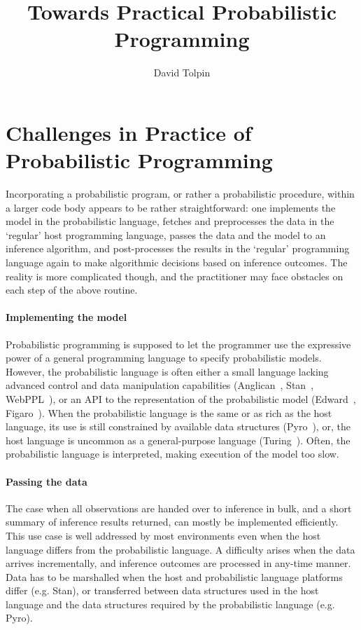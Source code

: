 \documentclass[sigplan,review]{acmart}\settopmatter{printfolios=true,printccs=false,printacmref=false}
\begin{document}
\title{Towards Practical Probabilistic Programming}
\author{David Tolpin}


\maketitle

\section{Challenges in Practice of Probabilistic Programming}

Incorporating a probabilistic program, or rather a probabilistic
procedure, within a larger code body appears to be rather
straightforward: one implements the model in the probabilistic
language, fetches and preprocesses the data in the
`regular' host programming language, passes the data and the
model to an inference algorithm, and post-processes the results
in the `regular' programming language again to make algorithmic
decisions based on inference outcomes. The reality is more
complicated though, and the practitioner may face obstacles on
each step of the above routine.

\paragraph{Implementing the model} Probabilistic programming is
supposed to let the programmer use the expressive power of a
general programming language to specify probabilistic models.
However, the probabilistic language is often either a small
language lacking advanced control and data manipulation
capabilities (Anglican~\cite{TMY+16}, Stan~\cite{Stan17},
WebPPL~\cite{GS15}), or an API to the representation of the
probabilistic model (Edward~\cite{THS+17}, Figaro~\cite{P09}).
When the probabilistic language is the same or as rich as the
host language, its use is still constrained by available data
structures (Pyro~\cite{Pyro18}), or, the host language is 
uncommon as a general-purpose language (Turing~\cite{GXG18}).
Often, the probabilistic language is interpreted, making
execution of the model too slow.

\paragraph{Passing the data} The case when all observations are
handed over to inference in bulk, and a short summary of
inference results returned, can mostly be implemented
efficiently. This use case is well addressed by most
environments even when the host language differs from the
probabilistic language. A difficulty arises when
the data arrives incrementally, and inference outcomes are
processed in any-time manner. Data has to be marshalled when the
host and probabilistic language platforms differ (e.g.
Stan), or transferred between data structures used in
the host language and the data structures required by the
probabilistic language (e.g. Pyro).
\end{document}
